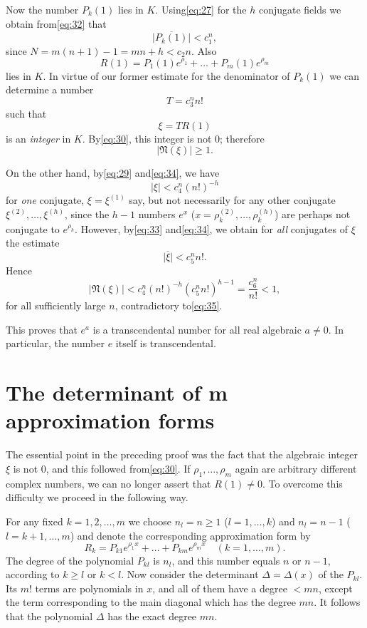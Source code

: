 Now the number $P_k(1)$ lies in $K$. Using\eqref{eq:27} for the $h$ conjugate fields we obtain from\eqref{eq:32} that
\begin{equation} \overline{|P_{k}(1)|} < c_{1}^{n}, \tag{33}\label{eq:33} \end{equation}
since $N=m(n+1)-1=mn+h < c_2 n$. Also
\[ R(1) = P_1(1) e^{\rho_1} + \dots + P_m(1) e^{\rho_m} \]
lies in $K$. In virtue of our former estimate for the denominator of $P_k(1)$ we can determine a number
\begin{equation} T = c_3^n n! \tag{34}\label{eq:34} \end{equation}
such that
\[ \xi = TR(1) \]
is an \textit{integer} in $K$. By\eqref{eq:30}, this integer is not 0; therefore
\begin{equation} |\mathfrak{N}(\xi)| \geq 1. \tag{35}\label{eq:35} \end{equation}

On the other hand, by\eqref{eq:29} and\eqref{eq:34}, we have
\[ |\xi| < c_4^n(n!)^{-h} \]
for \textit{one} conjugate, $\xi = \xi^{(1)}$ say, but not necessarily for any other conjugate $\xi^{(2)}, \ldots, \xi^{(h)}$, since the $h-1$ numbers $e^x$ ($x=\rho_k^{(2)},\ldots,\rho_k^{(h)}$) are perhaps not conjugate to $e^{\rho_k}$. However, by\eqref{eq:33} and\eqref{eq:34}, we obtain for \textit{all} conjugates of $\xi$ the estimate
\[ \overline{|\xi|} < c_5^n n!. \]
Hence
\[ |\mathfrak{N}(\xi)| < c_4^n(n!)^{-h}(c_5^n n!)^{h-1} = \frac{c_6^n}{n!} < 1, \]
for all sufficiently large $n$, contradictory to\eqref{eq:35}.

This proves that $e^a$ is a transcendental number for all real algebraic $a \neq 0$. In particular, the number $e$ itself is transcendental.

\section{The determinant of m approximation forms}

The essential point in the preceding proof was the fact that the algebraic integer $\xi$ is not 0, and this followed from\eqref{eq:30}. If $\rho_1, \dots, \rho_m$ again are arbitrary different complex numbers, we can no longer assert that $R(1) \neq 0$. To overcome this difficulty we proceed in the following way.

For any fixed $k=1, 2, \dots, m$ we choose $n_l = n \geq 1$ ($l=1, \dots, k$) and $n_l = n-1$ ($l=k+1, \dots, m$) and denote the corresponding approximation form by
\[ R_{k} = P_{k1} e^{\rho_{1}x} + \dots + P_{km} e^{\rho_{m}x} \quad (k=1,\dots,m). \]
The degree of the polynomial $P_{kl}$ is $n_l$, and this number equals $n$ or $n-1$, according to $k \geq l$ or $k < l$. Now consider the determinant $\Delta = \Delta(x)$ of the $P_{kl}$. Its $m!$ terms are polynomials in $x$, and all of them have a degree $< mn$, except the term corresponding to the main diagonal which has the degree $mn$. It follows that the polynomial $\Delta$ has the exact degree $mn$.

